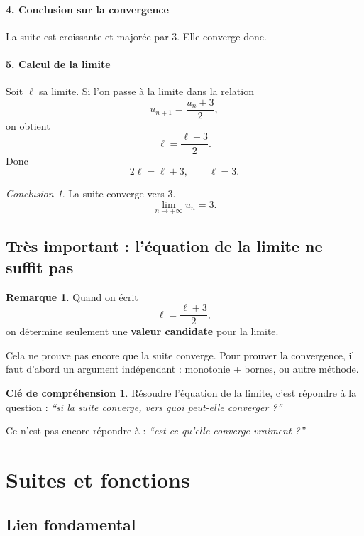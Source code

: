 \documentclass[11pt,a4paper]{article}
\theoremstyle{definition}
\newtheorem{remarque}[definition]{Remarque}
\newtheorem{interpretation}[definition]{Clé de compréhension}
\theoremstyle{plain}
\theoremstyle{remark}
\newtheorem*{conclusion}{Conclusion}
\begin{document}
\paragraph{4. Conclusion sur la convergence}
La suite est croissante et majorée par $3$. Elle converge donc.

\paragraph{5. Calcul de la limite}
Soit $\ell$ sa limite. Si l'on passe à la limite dans la relation
\[
u_{n+1}=\frac{u_n+3}{2},
\]
on obtient
\[
\ell=\frac{\ell+3}{2}.
\]
Donc
\[
2\ell=\ell+3,
\qquad
\ell=3.
\]

\begin{conclusion}
La suite converge vers $3$.
\[
\boxed{\lim_{n\to+\infty}u_n=3.}
\]
\end{conclusion}

\subsection{Très important : l'équation de la limite ne suffit pas}

\begin{remarque}
Quand on écrit
\[
\ell=\frac{\ell+3}{2},
\]
on détermine seulement une \textbf{valeur candidate} pour la limite.

Cela ne prouve pas encore que la suite converge.  
Pour prouver la convergence, il faut d'abord un argument indépendant : monotonie + bornes, ou autre méthode.
\end{remarque}

\begin{interpretation}
Résoudre l'équation de la limite, c'est répondre à la question :
\emph{``si la suite converge, vers quoi peut-elle converger ?''}

Ce n'est pas encore répondre à :
\emph{``est-ce qu'elle converge vraiment ?''}
\end{interpretation}

\section{Suites et fonctions}

\subsection{Lien fondamental}
\end{document}
